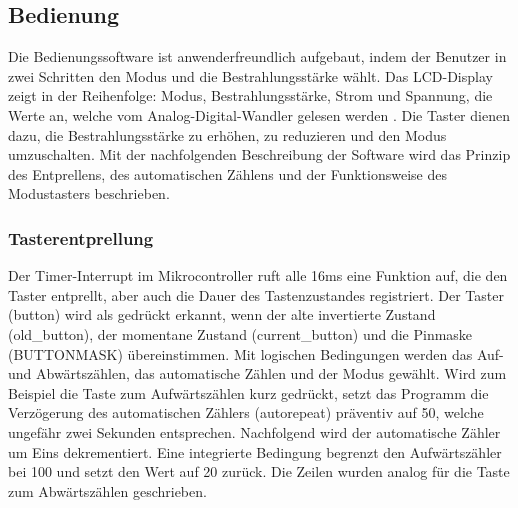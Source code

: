 \subsection{Bedienung}
Die Bedienungssoftware ist anwenderfreundlich aufgebaut, indem der Benutzer in zwei Schritten den Modus und die Bestrahlungsstärke wählt.
\newline
Das LCD-Display zeigt in der Reihenfolge:  Modus, Bestrahlungsstärke, Strom und Spannung, die Werte an, welche vom Analog-Digital-Wandler gelesen werden . Die Taster dienen dazu, die Bestrahlungsstärke zu erhöhen, zu reduzieren und den Modus umzuschalten. Mit der nachfolgenden Beschreibung der Software wird das Prinzip des Entprellens, des automatischen Zählens und der Funktionsweise des Modustasters beschrieben.

\subsubsection{Tasterentprellung}
Der Timer-Interrupt im Mikrocontroller ruft alle 16ms eine Funktion auf, die den Taster entprellt, aber auch die Dauer des Tastenzustandes registriert.
Der Taster (button) wird als gedrückt erkannt, wenn der alte invertierte Zustand (old\_button), der momentane Zustand (current\_button) und die Pinmaske (BUTTONMASK) übereinstimmen.
Mit logischen Bedingungen werden das Auf- und Abwärtszählen, das automatische Zählen und der Modus gewählt. Wird zum Beispiel die Taste zum Aufwärtszählen kurz gedrückt, setzt das Programm die Verzögerung des automatischen Zählers (autorepeat) präventiv auf 50, welche ungefähr zwei Sekunden entsprechen. Nachfolgend wird der automatische Zähler um Eins dekrementiert. Eine integrierte Bedingung begrenzt den Aufwärtszähler bei 100 und setzt den Wert auf 20 zurück. 
\newline
Die Zeilen wurden analog für die Taste zum Abwärtszählen geschrieben.

